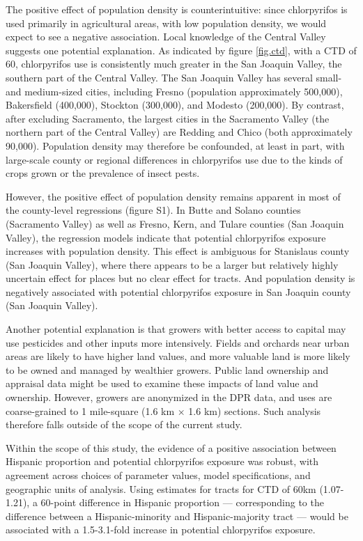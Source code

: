 \documentclass[ijerph,article,submit,oneauthor,pdftex]{Definitions/mdpi}
\begin{document}
The positive effect of population density is counterintuitive: since chlorpyrifos is used primarily in agricultural areas, with low population density, we would expect to see a negative association. Local knowledge of the Central Valley suggests one potential explanation.  As indicated by figure \ref{fig.ctd}, with a CTD of 60, chlorpyrifos use is consistently much greater in the San Joaquin Valley, the southern part of the Central Valley.  The San Joaquin Valley has several small- and medium-sized cities, including Fresno (population approximately 500,000), Bakersfield (400,000), Stockton (300,000), and Modesto (200,000).  By contrast, after excluding Sacramento, the largest cities in the Sacramento Valley (the northern part of the Central Valley) are Redding and Chico (both approximately 90,000).  Population density may therefore be confounded, at least in part, with large-scale county or regional differences in chlorpyrifos use due to the kinds of crops grown or the prevalence of insect pests.

However, the positive effect of population density remains apparent in most of the county-level regressions (figure S1).  In Butte and Solano counties (Sacramento Valley) as well as Fresno, Kern, and Tulare counties (San Joaquin Valley), the regression models indicate that potential chlorpyrifos exposure increases with population density.  This effect is ambiguous for Stanislaus county (San Joaquin Valley), where there appears to be a larger but relatively highly uncertain effect for places but no clear effect for tracts.  And population density is negatively associated with potential chlorpyrifos exposure in San Joaquin county (San Joaquin Valley).  

Another potential explanation is that growers with better access to capital may use pesticides and other inputs more intensively.  Fields and orchards near urban areas are likely to have higher land values, and more valuable land is more likely to be owned and managed by wealthier growers.  Public land ownership and appraisal data might be used to examine these impacts of land value and ownership.  However, growers are anonymized in the DPR data, and uses are coarse-grained to 1 mile-square (1.6 km $\times$ 1.6 km) sections.  Such analysis therefore falls outside of the scope of the current study.   

Within the scope of this study, the evidence of a positive association between Hispanic proportion and potential chlorpyrifos exposure was robust, with agreement across choices of parameter values, model specifications, and geographic units of analysis. Using estimates for tracts for CTD of 60km (1.07-1.21), a 60-point difference in Hispanic proportion --- corresponding to the difference between a Hispanic-minority and Hispanic-majority tract --- would be associated with a 1.5-3.1-fold increase in potential chlorpyrifos exposure. 
\end{document}
